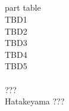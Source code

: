 \documentclass[dvipdfmx, a4paper, 12pt]{utarticle}
\begin{document}
\begin{CJK*}{UTF8}{min}
\begin{landscape}
\section{}
 part table\\
TBD1\\
TBD2\\
TBD3\\
TBD4\\
TBD5\\
\\
???\\
Hatakeyama ???

\end{landscape}
\end{CJK*}
\end{document}
